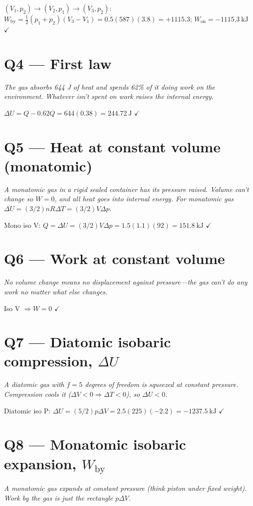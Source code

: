 \documentclass[11pt]{article}
\newcommand{\checkmk}{\ensuremath{\checkmark}}
\begin{document}
$(V_1,p_2)\to(V_2,p_1)\to(V_3,p_2)$:
$W_{\text{by}} = \tfrac12(p_1+p_2)(V_3-V_1) = 0.5(587)(3.8) = +1115.3$; $W_{\text{on}} = \boxed{-1115.3\ \text{kJ}}$ \checkmk

\section*{Q4 --- First law}
\emph{The gas absorbs 644 J of heat and spends 62\% of it doing work on the environment. Whatever isn't spent on work raises the internal energy.}

$\Delta U = Q - 0.62Q = 644(0.38) = \boxed{244.72\ \text{J}}$ \checkmk

\section*{Q5 --- Heat at constant volume (monatomic)}
\emph{A monatomic gas in a rigid sealed container has its pressure raised. Volume can't change so $W=0$, and all heat goes into internal energy. For monatomic gas $\Delta U = (3/2)nR\Delta T = (3/2)V\Delta p$.}

Mono iso V: $Q = \Delta U = (3/2)V\Delta p = 1.5(1.1)(92) = \boxed{151.8\ \text{kJ}}$ \checkmk

\section*{Q6 --- Work at constant volume}
\emph{No volume change means no displacement against pressure---the gas can't do any work no matter what else changes.}

Iso V $\Rightarrow W = \boxed{0}$ \checkmk

\section*{Q7 --- Diatomic isobaric compression, $\Delta U$}
\emph{A diatomic gas with $f=5$ degrees of freedom is squeezed at constant pressure. Compression cools it ($\Delta V < 0 \Rightarrow \Delta T < 0$), so $\Delta U < 0$.}

Diatomic iso P: $\Delta U = (5/2)p\Delta V = 2.5(225)(-2.2) = \boxed{-1237.5\ \text{kJ}}$ \checkmk

\section*{Q8 --- Monatomic isobaric expansion, $W_{\text{by}}$}
\emph{A monatomic gas expands at constant pressure (think piston under fixed weight). Work by the gas is just the rectangle $p\Delta V$.}
\end{document}
